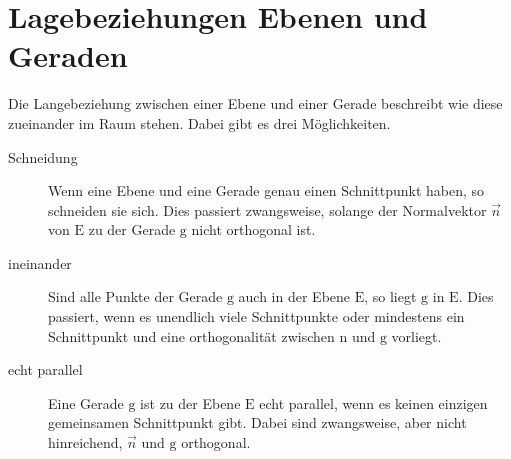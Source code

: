 \documentclass{article}
\begin{document}
 
\newcommand{\vect}[1]{\overrightarrow{#1}}
\newcommand{\drawplane}[0]{ 
 \begin{scope} 
  \clip(-0.7,0) rectangle (3.7,3);
  \fill[blue!20] (1.2-0*1.2-1.4,1-0*0.7+0.3) -- (1.2+1*1.2-1.4,1+1*0.7+0.3) -- (1.2+1*1.2+1.4,1+1*0.7-0.3) -- (1.2-0*1.2+1.4,1-0*0.7-0.3) -- cycle;
  \draw (1.5, 1.6) node[black] {$\mathrm{E}$}; 
 \end{scope}
} 
 
\newcommand{\drawuv}[0]{ 
 \draw[->,thick,blue] (0.3,1.35) -- ++(1.2*0.5,0.7*0.5) node[above left] {$\vect{u}$};
 \draw[->,thick,red] (0.3,1.35) -- ++(1.4*0.5,-0.3*0.5) node[below left] {$\vect{v}$}; 
} 
  
\section{Lagebeziehungen Ebenen und Geraden}
Die Langebeziehung zwischen einer Ebene und einer Gerade beschreibt wie diese zueinander im Raum stehen. Dabei gibt es drei Möglichkeiten.
\begin{description}
 \item[Schneidung] Wenn eine Ebene und eine Gerade genau einen Schnittpunkt haben, so schneiden sie sich. Dies passiert zwangsweise, solange der Normalvektor $\vect{n}$ von $\mathrm{E}$ zu der Gerade $\mathrm{g}$ nicht orthogonal ist.
 \item[ineinander] Sind alle Punkte der Gerade $\mathrm{g}$ auch in der Ebene $\mathrm{E}$, so liegt $\mathrm{g}$ in $\mathrm{E}$. Dies passiert, wenn es unendlich viele Schnittpunkte oder mindestens ein Schnittpunkt und eine orthogonalität zwischen $\mathrm{n}$ und $\mathrm{g}$ vorliegt. 
 \item[echt parallel] Eine Gerade $\mathrm{g}$ ist zu der Ebene $\mathrm{E}$ echt parallel, wenn es keinen einzigen gemeinsamen Schnittpunkt gibt. Dabei sind zwangsweise, aber nicht hinreichend, $\vect{n}$ und $\mathrm{g}$ orthogonal.
\end{description}
 
\end{document}
